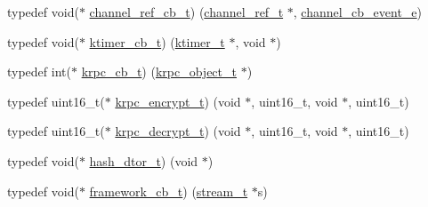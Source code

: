 \begin{DoxyCompactItemize}
\item 
typedef void($\ast$ \hyperlink{a00051_ae296ec4d1ce108960de8dcc423956a1d_ae296ec4d1ce108960de8dcc423956a1d}{channel\+\_\+ref\+\_\+cb\+\_\+t}) (\hyperlink{a00051_a151271c9d188ef28d4d24bb81dcc1263_a151271c9d188ef28d4d24bb81dcc1263}{channel\+\_\+ref\+\_\+t} $\ast$, \hyperlink{a00051_aaf2cba5d4035f3d56350b59342ebf65c_aaf2cba5d4035f3d56350b59342ebf65c}{channel\+\_\+cb\+\_\+event\+\_\+e})
\item 
typedef void($\ast$ \hyperlink{a00051_a2333fd0f2c3a85faf586300ca40deed4_a2333fd0f2c3a85faf586300ca40deed4}{ktimer\+\_\+cb\+\_\+t}) (\hyperlink{a00051_a846172ea4e8a86449eca41a3d8e074b7_a846172ea4e8a86449eca41a3d8e074b7}{ktimer\+\_\+t} $\ast$, void $\ast$)
\item 
typedef int($\ast$ \hyperlink{a00051_a06bb708c1b97445d3a5d0c1b32ad2ab6_a06bb708c1b97445d3a5d0c1b32ad2ab6}{krpc\+\_\+cb\+\_\+t}) (\hyperlink{a00051_a9c07dfc8c3b965f75b09f82fdb1bbb1e_a9c07dfc8c3b965f75b09f82fdb1bbb1e}{krpc\+\_\+object\+\_\+t} $\ast$)
\item 
typedef uint16\+\_\+t($\ast$ \hyperlink{a00051_ae41a67cc07f8dff897ca978e03b1f2d7_ae41a67cc07f8dff897ca978e03b1f2d7}{krpc\+\_\+encrypt\+\_\+t}) (void $\ast$, uint16\+\_\+t, void $\ast$, uint16\+\_\+t)
\item 
typedef uint16\+\_\+t($\ast$ \hyperlink{a00051_a5cf750f151c90f0589f68fe8c4421f1d_a5cf750f151c90f0589f68fe8c4421f1d}{krpc\+\_\+decrypt\+\_\+t}) (void $\ast$, uint16\+\_\+t, void $\ast$, uint16\+\_\+t)
\item 
typedef void($\ast$ \hyperlink{a00051_a5dcd1ed9242185e4448352748e58573d_a5dcd1ed9242185e4448352748e58573d}{hash\+\_\+dtor\+\_\+t}) (void $\ast$)
\item 
typedef void($\ast$ \hyperlink{a00051_a4252553890b97d1b0869581b40e11c3e_a4252553890b97d1b0869581b40e11c3e}{framework\+\_\+cb\+\_\+t}) (\hyperlink{a00051_a261dba04f46f5c59a68a05f69f5a65a8_a261dba04f46f5c59a68a05f69f5a65a8}{stream\+\_\+t} $\ast$s)
\end{DoxyCompactItemize}
